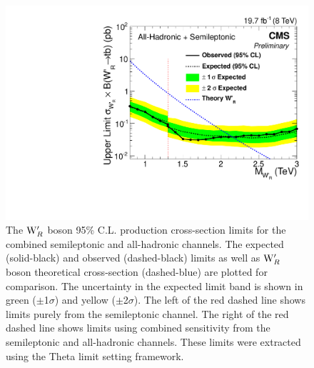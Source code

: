 \begin{figure}[htcb]
\centering
\includegraphics[width=1.0\textwidth]{AN-13-004/figs/limits_theta_Leptonic_Hadroniccomb_log.pdf}
\caption{The $\mathrm{W}^\prime_{R}$ boson 95\% C.L. production cross-section limits for the combined semileptonic and all-hadronic channels.  The expected (solid-black) and observed (dashed-black) limits as well as $\mathrm{W}^\prime_{R}$ boson theoretical cross-section (dashed-blue) are plotted for comparison.  
The uncertainty in the expected limit band is shown in green ($\pm$1$\sigma$) and yellow ($\pm$2$\sigma$).  The left of the red dashed line shows limits purely from the semileptonic channel.  The right of the red dashed line shows limits using combined sensitivity from the semileptonic and all-hadronic channels. 
These limits were extracted using the Theta limit setting framework.}
\label{figs:thetalimitcombo}
\end{figure}

